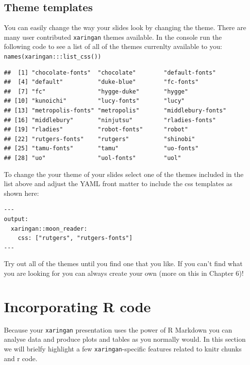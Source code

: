 \documentclass[
]{book}
\begin{document}
\hypertarget{theme-templates}{%
\subsection{Theme templates}\label{theme-templates}}

You can easily change the way your slides look by changing the theme. There are many user contributed \texttt{xaringan} themes available. In the console run the following code to see a list of all of the themes currenlty available to you: \texttt{names(xaringan:::list\_css())}

\begin{verbatim}
##  [1] "chocolate-fonts"  "chocolate"        "default-fonts"   
##  [4] "default"          "duke-blue"        "fc-fonts"        
##  [7] "fc"               "hygge-duke"       "hygge"           
## [10] "kunoichi"         "lucy-fonts"       "lucy"            
## [13] "metropolis-fonts" "metropolis"       "middlebury-fonts"
## [16] "middlebury"       "ninjutsu"         "rladies-fonts"   
## [19] "rladies"          "robot-fonts"      "robot"           
## [22] "rutgers-fonts"    "rutgers"          "shinobi"         
## [25] "tamu-fonts"       "tamu"             "uo-fonts"        
## [28] "uo"               "uol-fonts"        "uol"
\end{verbatim}

To change the your theme of your slides select one of the themes included in the list above and adjust the YAML front matter to include the css templates as shown here:

\begin{verbatim}
---
output:
  xaringan::moon_reader:
    css: ["rutgers", "rutgers-fonts"]
---
\end{verbatim}

Try out all of the themes until you find one that you like. If you can't find what you are looking for you can always create your own (more on this in Chapter 6)!

\hypertarget{incorporating-r-code}{%
\section{Incorporating R code}\label{incorporating-r-code}}

Because your \texttt{xaringan} presentation uses the power of R Markdown you can analyse data and produce plots and tables as you normally would. In this section we will brielfy highlight a few \texttt{xaringan}-specific features related to knitr chunks and r code.
\end{document}
